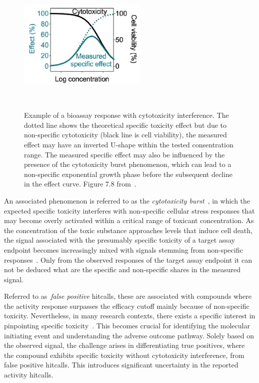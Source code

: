 \begin{figure}[htbp]  %
    \centering
    \includegraphics[width=0.55\textwidth]{figures/cytotoxicity.png}  
    \caption{Example of a bioassay response with cytotoxicity interference. The dotted line shows the theoretical specific toxicity effect but due to non-specific cytotoxicity (black line is cell viability), the measured effect may have an inverted U-shape within the tested consentration range. The measured specific effect may also be influenced by the presence of the cytotoxicity burst phenomenon, which can lead to a non-specific exponential growth phase before the subsequent decline in the effect curve. Figure 7.8 from~\cite{escher2021}.}
~\label{fig:cytotoxicity} 
\end{figure}

An associated phenomenon is referred to as the \emph{cytotoxicity burst}~\cite{judson2016}, in which the expected specific toxicity interferes with non-specific cellular stress responses that may become overly activated within a critical range of toxicant concentration. As the concentration of the toxic substance approaches levels that induce cell death, the signal associated with the presumably specific toxicity of a target assay endpoint becomes increasingly mixed with signals stemming from non-specific responses~\cite{escher2021}. Only from the observed responses of the target assay endpoint it can not be deduced what are the specific and non-specific shares in the measured signal.

Referred to as~\emph{false positive} hitcalls, these are associated with compounds where the activity response surpasses the efficacy cutoff mainly because of non-specific toxicity. Nevertheless, in many research contexts, there exists a specific interest in pinpointing specific toxicity~\cite{fay2018}. This becomes crucial for identifying the molecular initiating event and understanding the adverse outcome pathway. Solely based on the observed signal, the challenge arises in differentiating true positives, where the compound exhibits specific toxicity without cytotoxicity interference, from false positive hitcalls. This introduces significant uncertainty in the reported activity hitcalls.

